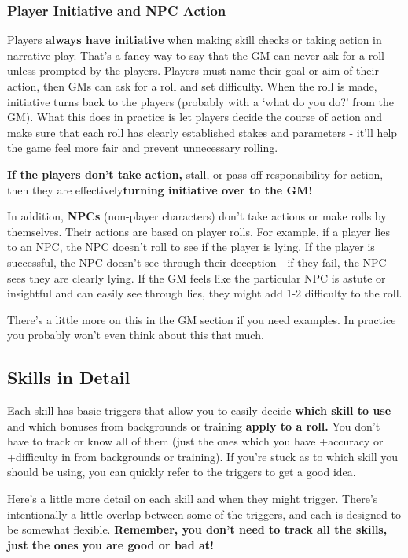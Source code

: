 \subsubsection{Player Initiative and NPC Action}

Players \textbf{always have initiative} when making skill checks or taking action in narrative play. That’s a fancy way to say that the GM can never ask for a roll unless prompted by the players. Players must name their goal or aim of their action, then GMs can ask for a roll and set difficulty. When the roll is made, initiative turns back to the players (probably with a ‘what do you do?’ from the GM). What this does in practice is let players decide the course of action and make sure that each roll has clearly established stakes and parameters - it’ll help the game feel more fair and prevent unnecessary rolling. 

\textbf{If the players don’t take action,} stall, or pass off responsibility for action, then they are effectively\textbf{turning initiative over to the GM!} 

In addition, \textbf{NPCs} (non-player characters) don’t take actions or make rolls by themselves. Their actions are based on player rolls. For example, if a player lies to an NPC, the NPC doesn’t roll to see if the player is lying. If the player is successful, the NPC doesn’t see through their deception - if they fail, the NPC sees they are clearly lying. If the GM feels like the particular NPC is astute or insightful and can easily see through lies, they might add 1-2 difficulty to the roll.

There’s a little more on this in the GM section if you need examples. In practice you probably won’t even think about this that much.

\subsection{Skills in Detail}

Each skill has basic triggers that allow you to easily decide \textbf{which skill to use} and which bonuses from backgrounds or training \textbf{apply to a roll.} You don’t have to track or know all of them (just the ones which you have +accuracy or +difficulty in from backgrounds or training). If you’re stuck as to which skill you should be using, you can quickly refer to the triggers to get a good idea. 

Here’s a little more detail on each skill and when they might trigger. There’s intentionally a little overlap between some of the triggers, and each is designed to be somewhat flexible. \textbf{Remember, you don’t need to track all the skills, just the ones you are good or bad at!} 

